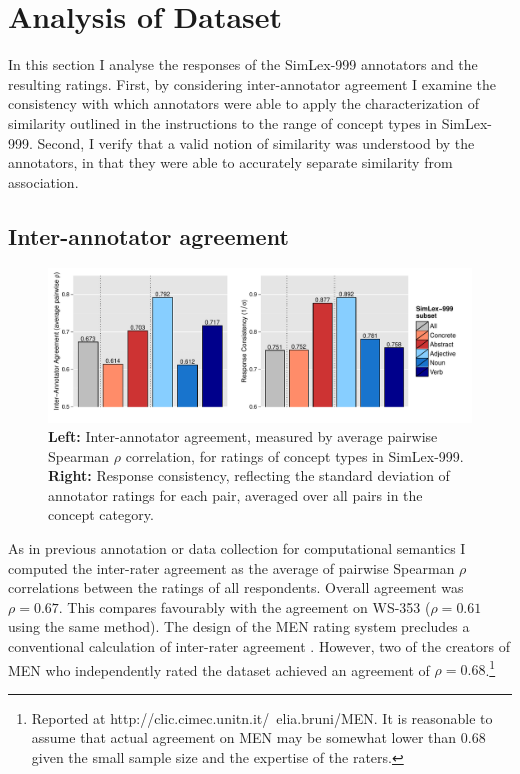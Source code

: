 \section{Analysis of Dataset}
\label{analysis}
In this section I analyse the responses of the SimLex-999 annotators and the resulting ratings. First, by considering inter-annotator agreement I examine the consistency with which annotators were able to apply the characterization of similarity outlined in the instructions to the range of concept types in SimLex-999. Second, I verify that a valid notion of similarity was understood by the annotators, in that they were able to accurately separate similarity from association. 

\subsection{Inter-annotator agreement}

\begin{figure}[ht]  \includegraphics[width = \textwidth]{Chapter_2/Figure_1A_CL}  \caption{\label{fig4} {\bf Left:} Inter-annotator agreement, measured by average pairwise Spearman \(\rho\) correlation, for ratings of concept types in SimLex-999. {\bf Right:} Response consistency, reflecting the standard deviation of annotator ratings for each pair, averaged over all pairs in the concept category.}\end{figure}  

As in previous annotation or data collection for computational semantics \citep{pado2007flexible,reisinger2010mixture,silberer2014learning} I computed the inter-rater agreement as the average of pairwise Spearman \(\rho\) correlations between the ratings of all respondents. Overall agreement was \(\rho=0.67\). This compares favourably with the agreement on WS-353 (\(\rho=0.61\) using the same method). The design of the MEN rating system precludes a conventional calculation of inter-rater agreement \citep{bruni2012distributional2}. However, two of the creators of MEN who independently rated the dataset achieved an agreement of \(\rho=0.68\).\footnote{Reported at http://clic.cimec.unitn.it/~elia.bruni/MEN. It is reasonable to assume that actual agreement on MEN may be somewhat lower than 0.68 given the small sample size and the expertise of the raters.} 

